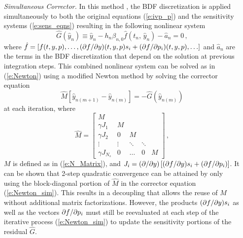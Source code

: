 \begin{itemize}
\item[{\em Simultaneous Corrector.}] 
  In this method \cite{MaPe:97}, the BDF discretization is applied simultaneously
  to both the original equations (\ref{e:ivp_p}) and the sensitivity systems
  (\ref{e:sens_eqns}) resulting in the following nonlinear system 
  \begin{equation*}
    {\hat G}({\hat y}_n) \equiv  
    {\hat y}_n - h_n\beta_{n,0} {\hat f}(t_n,\,{\hat y}_n) - {\hat a}_n = 0 \, ,
  \end{equation*}
  where
  ${\hat f} = [ f(t,y,p), \ldots , (\partial f / \partial y)(t,y,p) s_i + (\partial f / \partial p_i)(t,y,p) , \ldots ]$
  and ${\hat a}_n$ are the terms in the BDF discretization that depend on the
  solution at previous integration steps.
  This combined nonlinear system can be solved as in (\ref{e:Newton}) using
  a modified Newton method by solving the corrector equation
  \begin{equation}\label{e:Newton_sim}
    {\hat M}[{\hat y}_{n(m+1)}-{\hat y}_{n(m)}]=-{\hat G}({\hat y}_{n(m)})
  \end{equation}
  at each iteration, where 
  \begin{equation*}
    {\hat M} = 
    \begin{bmatrix}
      M              &        &        &        &   \\
      \gamma J_1     & M      &        &        &   \\
      \gamma J_2     & 0      & M      &        &   \\
      \vdots         & \vdots & \ddots & \ddots &   \\
      \gamma J_{N_s} & 0      & \ldots & 0      & M 
    \end{bmatrix} \, ,
  \end{equation*}
  $M$ is defined as in (\ref{e:N_Matrix}), and 
  $J_i = ({\partial}/{\partial y})\left[ (\partial f / \partial y) s_i + (\partial f / \partial p_i) \right]$.
  It can be shown that 2-step quadratic convergence can be attained by only
  using the block-diagonal portion of ${\hat M}$ in the corrector equation
  (\ref{e:Newton_sim}). This results in a decoupling that allows the reuse of 
  $M$ without additional matrix factorizations. However, the products
  $(\partial f / \partial y)s_i$ as well as the vectors $\partial f / \partial p_i$ must still be reevaluated at 
  each step of the iterative process (\ref{e:Newton_sim}) to update the 
  sensitivity portions of the residual ${\hat G}$.
  

\end{itemize}
